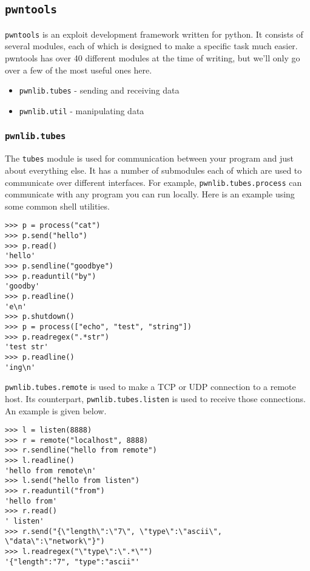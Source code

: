 \documentclass{article}
\begin{document}
\subsection{\texttt{pwntools}}
\texttt{pwntools} is an exploit development framework written for python. It
consists of several modules, each of which is designed to make a specific task
much easier.  pwntools has over 40 different modules at the time of writing, but
we'll only go over a few of the most useful ones here.

\begin{itemize}
    \item \texttt{pwnlib.tubes} - sending and receiving data
    \item \texttt{pwnlib.util} - manipulating data
\end{itemize}

\subsubsection{\texttt{pwnlib.tubes}}
The \texttt{tubes} module is used for communication between your program and
just about everything else. It has a number of submodules each of which are used
to communicate over different interfaces. For example,
\texttt{pwnlib.tubes.process} can communicate with any program you can run
locally. Here is an example using some common shell utilities.

\begin{lstlisting}
>>> p = process("cat")
>>> p.send("hello")
>>> p.read()
'hello'
>>> p.sendline("goodbye")
>>> p.readuntil("by")
'goodby'
>>> p.readline()
'e\n'
>>> p.shutdown()
>>> p = process(["echo", "test", "string"]) 
>>> p.readregex(".*str")
'test str'
>>> p.readline()
'ing\n'
\end{lstlisting}

\texttt{pwnlib.tubes.remote} is used to make a TCP or UDP connection to a remote
host. Its counterpart, \texttt{pwnlib.tubes.listen} is used to receive those
connections. An example is given below.

\begin{lstlisting}
>>> l = listen(8888)
>>> r = remote("localhost", 8888)
>>> r.sendline("hello from remote")
>>> l.readline()
'hello from remote\n'
>>> l.send("hello from listen")
>>> r.readuntil("from")
'hello from'
>>> r.read()
' listen'
>>> r.send("{\"length\":\"7\", \"type\":\"ascii\", \"data\":\"network\"}")
>>> l.readregex("\"type\":\".*\"")
'{"length":"7", "type":"ascii"'
\end{lstlisting}
\end{document}
